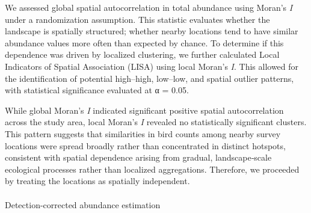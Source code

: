 \documentclass[
  letterpaper,
  DIV=11,
  numbers=noendperiod]{scrartcl}
\makeatletter
\let\oldparagraph\paragraph
\renewcommand{\paragraph}{
    \@ifstar
      \xxxParagraphStar
      \xxxParagraphNoStar
  }
\newcommand{\xxxParagraphStar}[1]{\oldparagraph*{#1}\mbox{}}
\newcommand{\xxxParagraphNoStar}[1]{\oldparagraph{#1}\mbox{}}
\makeatother
\begin{document}
We assessed global spatial autocorrelation in total abundance using
Moran's \emph{I} under a randomization assumption. This statistic
evaluates whether the landscape is spatially structured; whether nearby
locations tend to have similar abundance values more often than expected
by chance. To determine if this dependence was driven by localized
clustering, we further calculated Local Indicators of Spatial
Association (LISA) using local Moran's \emph{I}. This allowed for the
identification of potential high--high, low--low, and spatial outlier
patterns, with statistical significance evaluated at α = 0.05.

While global Moran's \emph{I} indicated significant positive spatial
autocorrelation across the study area, local Moran's \emph{I} revealed
no statistically significant clusters. This pattern suggests that
similarities in bird counts among nearby survey locations were spread
broadly rather than concentrated in distinct hotspots, consistent with
spatial dependence arising from gradual, landscape‑scale ecological
processes rather than localized aggregations. Therefore, we proceeded by
treating the locations as spatially independent.

\paragraph{Detection-corrected abundance
estimation}\label{detection-corrected-abundance-estimation}
\end{document}
